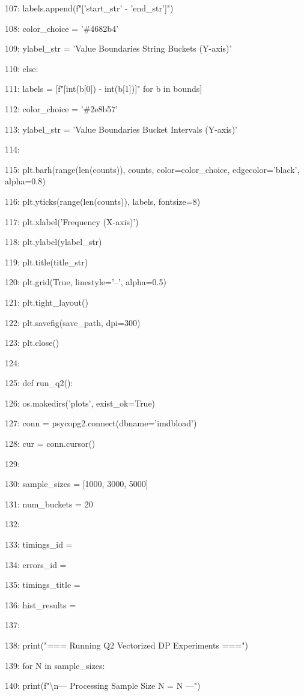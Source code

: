 \documentclass[11pt,a4paper]{article}
\begin{document}
107:             labels.append(f"['{start\_str}' - '{end\_str}']")

108:         color\_choice = '\#4682b4'

109:         ylabel\_str = 'Value Boundaries String Buckets (Y-axis)'

110:     else:

111:         labels = [f"[{int(b[0])} - {int(b[1])}]" for b in bounds]

112:         color\_choice = '\#2e8b57'

113:         ylabel\_str = 'Value Boundaries Bucket Intervals (Y-axis)'

114:

115:     plt.barh(range(len(counts)), counts, color=color\_choice, edgecolor='black', alpha=0.8)

116:     plt.yticks(range(len(counts)), labels, fontsize=8)

117:     plt.xlabel('Frequency (X-axis)')

118:     plt.ylabel(ylabel\_str)

119:     plt.title(title\_str)

120:     plt.grid(True, linestyle='--', alpha=0.5)

121:     plt.tight\_layout()

122:     plt.savefig(save\_path, dpi=300)

123:     plt.close()

124:

125: def run\_q2():

126:     os.makedirs('plots', exist\_ok=True)

127:     conn = psycopg2.connect(dbname='imdbload')

128:     cur = conn.cursor()

129:

130:     sample\_sizes = [1000, 3000, 5000]

131:     num\_buckets = 20

132:

133:     timings\_id = {}

134:     errors\_id = {}

135:     timings\_title = {}

136:     hist\_results = {}

137:

138:     print("=== Running Q2 Vectorized DP Experiments ===")

139:     for N in sample\_sizes:

140:         print(f"\textbackslash{}n--- Processing Sample Size N = {N} ---")
\end{document}
